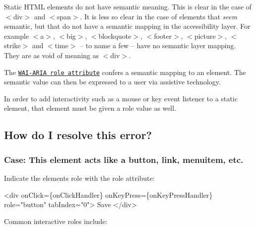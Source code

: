 Static H\+T\+ML elements do not have semantic meaning. This is clear in the case of {\ttfamily $<$div$>$} and {\ttfamily $<$span$>$}. It is less so clear in the case of elements that {\itshape seem} semantic, but that do not have a semantic mapping in the accessibility layer. For example {\ttfamily $<$a$>$}, {\ttfamily $<$big$>$}, {\ttfamily $<$blockquote$>$}, {\ttfamily $<$footer$>$}, {\ttfamily $<$picture$>$}, {\ttfamily $<$strike$>$} and {\ttfamily $<$time$>$} -- to name a few -- have no semantic layer mapping. They are as void of meaning as {\ttfamily $<$div$>$}.

The \href{https://www.w3.org/TR/wai-aria-1.1/#usage_intro}{\tt W\+A\+I-\/\+A\+R\+IA {\ttfamily role} attribute} confers a semantic mapping to an element. The semantic value can then be expressed to a user via assistive technology.

In order to add interactivity such as a mouse or key event listener to a static element, that element must be given a role value as well.

\subsection*{How do I resolve this error?}

\subsubsection*{Case\+: This element acts like a button, link, menuitem, etc.}

Indicate the element\textquotesingle{}s role with the {\ttfamily role} attribute\+:


\begin{DoxyCode}
<div
  onClick=\{onClickHandler\}
  onKeyPress=\{onKeyPressHandler\}
  role="button"
  tabIndex="0">
  Save
</div>
\end{DoxyCode}


Common interactive roles include\+:


